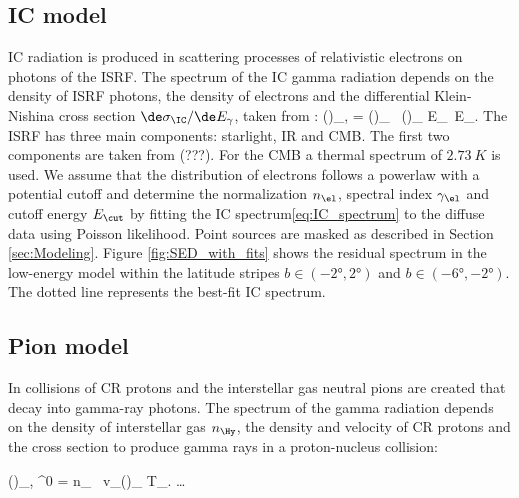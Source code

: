 \subsection{IC model}
\label{sec:IC_model}

IC radiation is produced in scattering processes of relativistic electrons on photons of the ISRF. The spectrum of the IC gamma radiation depends on the density of ISRF photons, the density of electrons and the differential Klein-Nishina cross section $\de \sigma_\IC / \de E_\gamma$, taken from \citep{1970RvMP...42..237B}:
\be
\left(\right)_{\!\!\gamma,\IC}\! = \int\!\! \int \left(\right)_{\!\!\ISRF} \ \left(\right)_{\!\!\el} \de E_\ISRF\, \de E_\el.
\label{eq:IC_spectrum}
\ee
The ISRF has three main components: starlight, IR and CMB. The first two components are taken from (???). For the CMB a thermal spectrum of $\SI{2.73}{K}$ is used. We assume that the distribution of electrons follows a powerlaw with a potential cutoff
and determine the normalization $n_\el$, spectral index $\gamma_\el$ and cutoff energy $E_\cut$  by fitting the IC spectrum\eqref{eq:IC_spectrum} to the diffuse \Fermi data using Poisson likelihood. Point sources are masked as described in Section \ref{sec:Modeling}. Figure \ref{fig:SED_with_fits} shows the residual spectrum in the low-energy model within the latitude stripes $b \in (-\ang{2}, \ang{2})$ and $b \in (-\ang{6}, -\ang{2})$. The dotted line represents the best-fit IC spectrum.





\subsection{Pion model}
\label{sec:Pion_model}

In collisions of CR protons and the interstellar gas neutral pions are created that decay into gamma-ray photons. The spectrum of the gamma radiation depends on the density of interstellar gas $n_\Hy$, the density and velocity of CR protons and the cross section to produce gamma rays in a proton-nucleus collision:

\be
\left(\right)_{\!\!\gamma, \pi^0}\! = \int n_\Hy\  v_\pr \left(\right)_{\!\!\pr} \de T_\pr.
\ee
\dots